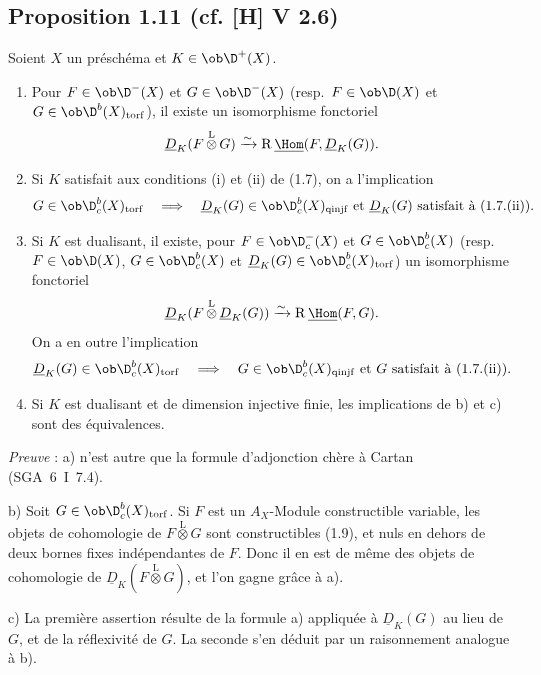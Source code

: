 \subsection*{Proposition 1.11 (cf. [H] V 2.6)}
Soient $X$ un préschéma et $K \in \ob \D^{+}(X)$.
\begin{enumerate}
\item[a)] Pour $F \in \ob \D^{-}(X)$ et $G \in \ob \D^{-}(X)$ (resp.~$F \in \ob \D(X)$ et $G \in \ob \D^{b}(X)_{\mathrm{torf}}$), il existe un isomorphisme fonctoriel
\[
\underline{D}_K(F \mathop{\otimes}\limits^{\mathrm{L}} G) \xrightarrow{\sim} \mathrm{R}\,\underline{\Hom}(F, \underline{D}_K(G)).
\]
\item[b)] Si $K$
satisfait aux conditions (i) et (ii) de (1.7), on a l'implication
\[
G \in \ob \D_c^{b}(X)_{\mathrm{torf}} \quad \Longrightarrow \quad \underline{D}_K(G) \in \ob \D_c^{b}(X)_{\mathrm{qinjf}} \text{ et } \underline{D}_K(G) \text{ satisfait à (1.7.(ii)).}
\]
\item[c)] Si $K$ est dualisant, il existe, pour $F \in \ob \D_c^{-}(X)$ et $G \in \ob \D_c^{b}(X)$ (resp.~$F \in \ob \D(X)$, $G \in \ob \D_c^{b}(X)$ et $\underline{D}_K(G) \in \ob \D_c^{b}(X)_{\mathrm{torf}}$) un isomorphisme fonctoriel
\[
\underline{D}_K(F \mathop{\otimes}\limits^{\mathrm{L}} \underline{D}_K(G)) \xrightarrow{\sim} \mathrm{R}\,\underline{\Hom}(F, G).
\]
On a en outre l'implication
\[
\underline{D}_K(G) \in \ob \D_c^{b}(X)_{\mathrm{torf}} \quad \Longrightarrow \quad G \in \ob \D_c^{b}(X)_{\mathrm{qinjf}} \text{ et } G \text{ satisfait à (1.7.(ii)).}
\]
\item[d)] Si $K$ est dualisant et de dimension injective finie, les implications de b) et c) sont des équivalences.
\end{enumerate}

\emph{Preuve} : a) n'est autre que la formule d'adjonction chère à Cartan (SGA~6~I~7.4).

b) Soit $G \in \ob \D_c^{b}(X)_{\mathrm{torf}}$. Si $F$ est un $A_X$-Module constructible variable, les objets de cohomologie de $F \mathop{\otimes}\limits^{\mathrm{L}} G$ sont constructibles (1.9), et nuls en dehors de deux bornes fixes indépendantes de $F$. Donc il en est de même des objets de cohomologie de $\underline{D}_K(F \mathop{\otimes}\limits^{\mathrm{L}} G)$, et l'on gagne grâce à a).

c) La première assertion résulte de la formule a) appliquée à $\underline{D}_K(G)$ au lieu de $G$, et de la réflexivité de $G$. La seconde s'en déduit par un raisonnement analogue à b).

